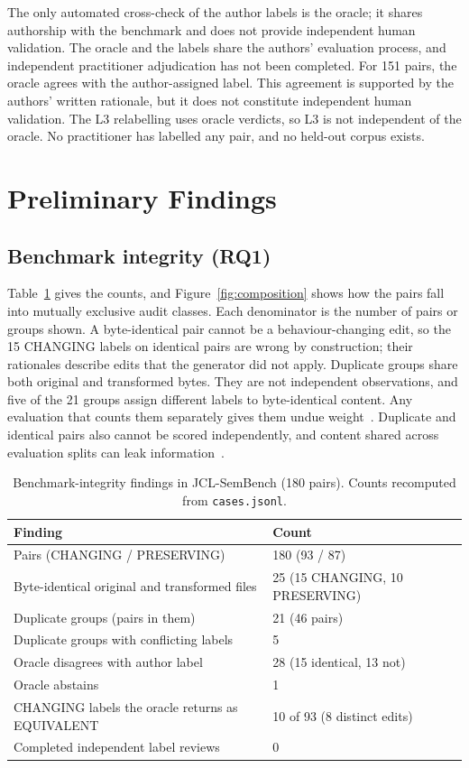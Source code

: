 \documentclass[conference]{IEEEtran}
\begin{document}
The only automated cross-check of the author labels is the oracle; it shares authorship with the benchmark and does not provide independent human validation. The oracle and the labels share the authors' evaluation process, and independent practitioner adjudication has not been completed. For 151 pairs, the oracle agrees with the author-assigned label. This agreement is supported by the authors' written rationale, but it does not constitute independent human validation. The L3 relabelling uses oracle verdicts, so L3 is not independent of the oracle. No practitioner has labelled any pair, and no held-out corpus exists.

\section{Preliminary Findings}
\subsection{Benchmark integrity (RQ1)}
Table~\ref{tab:integrity} gives the counts, and Figure~\ref{fig:composition} shows how the pairs fall into mutually exclusive audit classes. Each denominator is the number of pairs or groups shown. A byte-identical pair cannot be a behaviour-changing edit, so the 15 CHANGING labels on identical pairs are wrong by construction; their rationales describe edits that the generator did not apply. Duplicate groups share both original and transformed bytes. They are not independent observations, and five of the 21 groups assign different labels to byte-identical content. Any evaluation that counts them separately gives them undue weight~\cite{allamanis2019}. Duplicate and identical pairs also cannot be scored independently, and content shared across evaluation splits can leak information~\cite{kapoor2023}.

\begin{table}[t]
\caption{Benchmark-integrity findings in JCL-SemBench (180 pairs). Counts recomputed from \texttt{cases.jsonl}.}
\label{tab:integrity}
\centering
\small
\begin{tabular}{@{}p{5.6cm}p{2.7cm}@{}}
\toprule
Finding & Count \\
\midrule
Pairs (CHANGING / PRESERVING) & 180 (93 / 87) \\
Byte-identical original and transformed files & 25 (15 CHANGING, 10 PRESERVING) \\
Duplicate groups (pairs in them) & 21 (46 pairs) \\
Duplicate groups with conflicting labels & 5 \\
Oracle disagrees with author label & 28 (15 identical, 13 not) \\
Oracle abstains & 1 \\
CHANGING labels the oracle returns as EQUIVALENT & 10 of 93 (8 distinct edits) \\
Completed independent label reviews & 0 \\
\bottomrule
\end{tabular}
\end{table}
\end{document}
